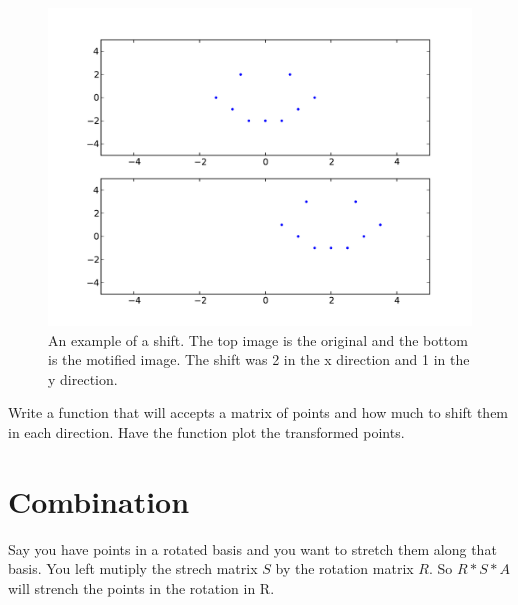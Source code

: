 \begin{figure}[H]
\includegraphics[scale = .5]{shift.pdf}
\caption{An example of a shift. The top image is the original and the bottom is the motified image. The shift was 2 in the x direction and 1 in the y direction.}
\end{figure}

\begin{problem}
Write a function that will accepts a matrix of points and how much to shift them in each direction. Have the function plot the transformed points.
\end{problem}

\section*{Combination}
Say you have points in a rotated basis and you want to stretch them along that basis. You left mutiply the strech matrix $S$ by the rotation matrix $R$. So $R*S*A$ will strench the points in the rotation in R. 

